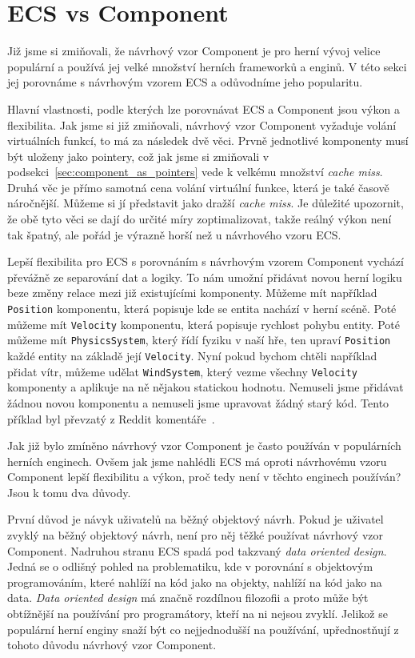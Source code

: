 \section{ECS vs Component}

Již jsme si zmiňovali, že návrhový vzor Component je pro herní vývoj velice populární a používá jej velké množství herních frameworků a enginů. V této sekci jej porovnáme s návrhovým vzorem ECS a odůvodníme jeho popularitu.

Hlavní vlastnosti, podle kterých lze porovnávat ECS a Component jsou výkon a flexibilita. Jak jsme si již zmiňovali, návrhový vzor Component vyžaduje volání virtuálních funkcí, to má za následek dvě věci. Prvně jednotlivé komponenty musí být uloženy jako pointery, což jak jsme si zmiňovali v podsekci~\ref{sec:component_as_pointers} vede k velkému množství \textit{cache miss}. Druhá věc je přímo samotná cena volání virtuální funkce, která je také časově náročnější. Můžeme si jí představit jako dražší \textit{cache miss}. Je důležité upozornit, že obě tyto věci se dají do určité míry zoptimalizovat, takže reálný výkon není tak špatný, ale pořád je výrazně horší než u návrhového vzoru ECS.

Lepší flexibilita pro ECS s porovnáním s návrhovým vzorem Component vychází převážně ze separování dat a logiky. To nám umožní přidávat novou herní logiku beze změny relace mezi již existujícími komponenty. Můžeme mít například \verb|Position| komponentu, která popisuje kde se entita nachází v herní scéně. Poté můžeme mít \verb|Velocity| komponentu, která popisuje rychlost pohybu entity. Poté můžeme mít \verb|PhysicsSystem|, který řídí fyziku v naší hře, ten upraví \verb|Position| každé entity na základě její \verb|Velocity|. Nyní pokud bychom chtěli například přidat vítr, můžeme udělat \verb|WindSystem|, který vezme všechny \verb|Velocity| komponenty a aplikuje na ně nějakou statickou hodnotu. Nemuseli jsme přidávat žádnou novou komponentu a nemuseli jsme upravovat žádný starý kód. Tento příklad byl převzatý z Reddit komentáře~\cite{ECSFlexibilityRedditExample}.

Jak již bylo zmíněno návrhový vzor Component je často používán v populárních herních enginech. Ovšem jak jsme nahlédli ECS má oproti návrhovému vzoru Component lepší flexibilitu a výkon, proč tedy není v těchto enginech používán? Jsou k tomu dva důvody.

První důvod je návyk uživatelů na běžný objektový návrh. Pokud je uživatel zvyklý na běžný objektový návrh, není pro něj těžké používat návrhový vzor Component. Nadruhou stranu ECS spadá pod takzvaný \textit{data oriented design}. Jedná se o odlišný pohled na problematiku, kde v porovnání s objektovým programováním, které nahlíží na kód jako na objekty, nahlíží na kód jako na data. \textit{Data oriented design} má značně rozdílnou filozofii a proto může být obtížnější na používání pro programátory, kteří na ni nejsou zvyklí. Jelikož se populární herní enginy snaží být co nejjednodušší na používání, upřednostňují z tohoto důvodu návrhový vzor Component.


